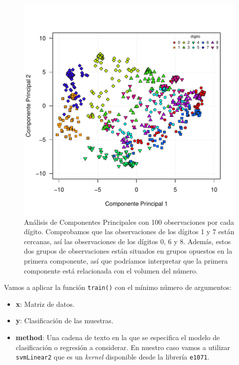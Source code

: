 \documentclass[12pt,spanish,a4paper]{article}
\numberwithin{equation}{section}
\begin{document}
\begin{figure}[h]

{\centering \includegraphics[width=0.95\linewidth]{graphics/svm/pca_entrenamiento-1} 

}

\caption{Análisis de Componentes Principales con 100 observaciones por cada dígito. Comprobamos que las observaciones de los dígitos 1 y 7 están cercanas, así las observaciones de los dígitos 0, 6 y 8. Además, estos dos grupos de observaciones están situados en grupos opuestos en la primera componente, así que podríamos interpretar que la primera componente está relacionada con el volumen del número.}\label{fig:pca_entrenamiento}
\end{figure}

Vamos a aplicar la función \texttt{train()} con el mínimo número de
argumentos:

\begin{itemize}
\item
  \textbf{x}: Matriz de datos.
\item
  \textbf{y}: Clasificación de las muestras.
\item
  \textbf{method}: Una cadena de texto en la que se especifica el modelo
  de clasificación o regresión a considerar. En nuestro caso vamos a
  utilizar \texttt{svmLinear2} que es un \emph{kernel} disponible desde
  la librería \texttt{e1071}.
\end{itemize}
\end{document}

